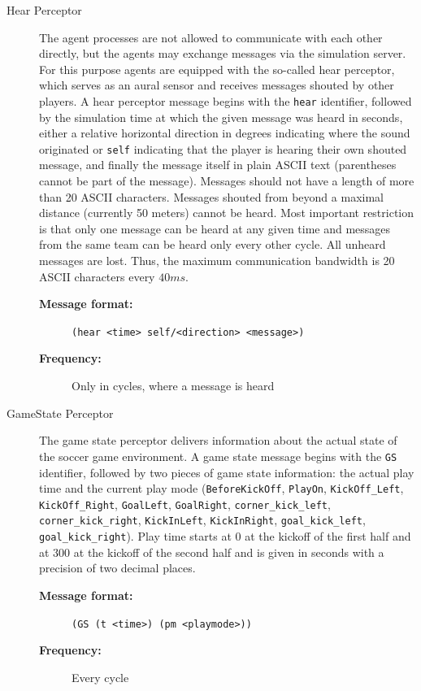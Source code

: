 \begin{description}
  \item [Hear Perceptor]
The agent processes are not allowed to communicate with each other directly, but the agents may exchange messages via the simulation server. For this purpose agents are equipped with the so-called hear perceptor, which serves as an aural sensor and receives messages shouted by other players. A hear perceptor message begins with the \texttt{hear} identifier, followed by the simulation time at which the given message was heard in seconds, either a relative horizontal direction in degrees indicating where the sound originated or \texttt{self} indicating that the player is hearing their own shouted message, and finally the message itself in plain ASCII text (parentheses cannot be part of the message). Messages should not have a length of more than 20 ASCII characters. Messages shouted from beyond a maximal distance (currently 50 meters) cannot be heard. Most important restriction is that only one message can be heard at any given time and messages from the same team can be heard only every other cycle. All unheard messages are lost. Thus, the maximum communication bandwidth is 20 ASCII characters every $40ms$.
  \begin{description}
  \item[{\bf Message format:}]
  \texttt{(hear <time> self/<direction> <message>)}
  \item[{\bf Frequency:}]
  Only in cycles, where a message is heard
  \end{description}
  
  
    \item [GameState Perceptor]
  The game state perceptor delivers information about the actual state of the soccer game environment. A game state message begins with the \texttt{GS} identifier, followed by two pieces of game state information: the actual play time and the current play mode (\texttt{BeforeKickOff}, \texttt{PlayOn}, \texttt{KickOff\_Left}, \texttt{KickOff\_Right}, \texttt{GoalLeft}, \texttt{GoalRight}, \texttt{corner\_kick\_left}, \texttt{corner\_kick\_right}, \texttt{KickInLeft}, \texttt{KickInRight}, \texttt{goal\_kick\_left}, \texttt{goal\_kick\_right}). Play time starts at $0$ at the kickoff of the first half and at $300$ at the kickoff of the second half and is given in seconds with a precision of two decimal places.
  \begin{description}
  \item[{\bf Message format:}]
  \texttt{(GS (t <time>) (pm <playmode>))}
  \item[{\bf Frequency:}]
 Every cycle
  \end{description}
\end{description}
